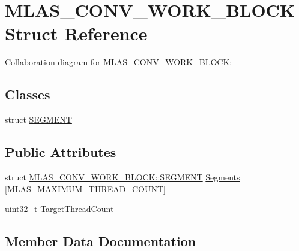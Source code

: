 \hypertarget{structMLAS__CONV__WORK__BLOCK}{}\section{M\+L\+A\+S\+\_\+\+C\+O\+N\+V\+\_\+\+W\+O\+R\+K\+\_\+\+B\+L\+O\+CK Struct Reference}
\label{structMLAS__CONV__WORK__BLOCK}


Collaboration diagram for M\+L\+A\+S\+\_\+\+C\+O\+N\+V\+\_\+\+W\+O\+R\+K\+\_\+\+B\+L\+O\+CK\+:
\subsection*{Classes}
\begin{DoxyCompactItemize}
\item 
struct \mbox{\hyperlink{structMLAS__CONV__WORK__BLOCK_1_1SEGMENT}{S\+E\+G\+M\+E\+NT}}
\end{DoxyCompactItemize}
\subsection*{Public Attributes}
\begin{DoxyCompactItemize}
\item 
struct \mbox{\hyperlink{structMLAS__CONV__WORK__BLOCK_1_1SEGMENT}{M\+L\+A\+S\+\_\+\+C\+O\+N\+V\+\_\+\+W\+O\+R\+K\+\_\+\+B\+L\+O\+C\+K\+::\+S\+E\+G\+M\+E\+NT}} \mbox{\hyperlink{structMLAS__CONV__WORK__BLOCK_aa9128bb85eb4d3e54bea431ee67fb705}{Segments}} \mbox{[}\mbox{\hyperlink{mlasi_8h_a86466d6811df85b69801ae746e3ad493}{M\+L\+A\+S\+\_\+\+M\+A\+X\+I\+M\+U\+M\+\_\+\+T\+H\+R\+E\+A\+D\+\_\+\+C\+O\+U\+NT}}\mbox{]}
\item 
uint32\+\_\+t \mbox{\hyperlink{structMLAS__CONV__WORK__BLOCK_a8ff37b91aebeb33c8fe1c3c38168d476}{Target\+Thread\+Count}}
\end{DoxyCompactItemize}


\subsection{Member Data Documentation}
\mbox{\label{structMLAS__CONV__WORK__BLOCK_aa9128bb85eb4d3e54bea431ee67fb705}} 
